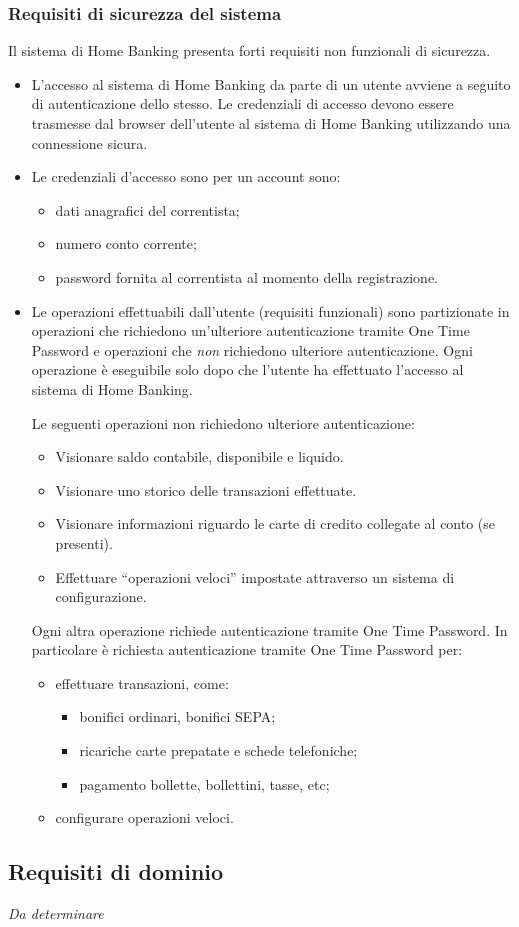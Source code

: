 \subsubsection{Requisiti di sicurezza del sistema}

Il sistema di Home Banking presenta forti requisiti non funzionali di sicurezza.

\begin{itemize}
	\item L'accesso al sistema di Home Banking da parte di un utente avviene a seguito di autenticazione dello stesso.
		Le credenziali di accesso devono essere trasmesse dal browser dell'utente al sistema di Home Banking utilizzando una connessione sicura.
	\item Le credenziali d'accesso sono per un account sono:
		\begin{itemize}
			\item dati anagrafici del correntista;
			\item numero conto corrente;
			\item password fornita al correntista al momento della registrazione.
		\end{itemize}
	\item Le operazioni effettuabili dall'utente (requisiti funzionali) sono partizionate in operazioni che richiedono un'ulteriore autenticazione tramite One Time Password e operazioni che \emph{non} richiedono ulteriore autenticazione.
	Ogni operazione \`e eseguibile solo dopo che l'utente ha effettuato l'accesso al sistema di Home Banking.

	Le seguenti operazioni non richiedono ulteriore autenticazione:
	\begin{itemize}
		\item Visionare saldo contabile, disponibile e liquido.
		\item Visionare uno storico delle transazioni effettuate.
		\item Visionare informazioni riguardo le carte di credito collegate al conto (se presenti).
		\item Effettuare ``operazioni veloci'' impostate attraverso un sistema di configurazione.
	\end{itemize}
	
	Ogni altra operazione richiede autenticazione tramite One Time Password.
	In particolare \`e richiesta autenticazione tramite One Time Password per:
	\begin{itemize}
		\item effettuare transazioni, come:
		\begin{itemize}
			\item bonifici ordinari, bonifici SEPA;
			\item ricariche carte prepatate e schede telefoniche;
			\item pagamento bollette, bollettini, tasse, etc;
		\end{itemize}
		\item configurare operazioni veloci.
	\end{itemize}
\end{itemize}

\subsection{Requisiti di dominio}

\emph{Da determinare}
